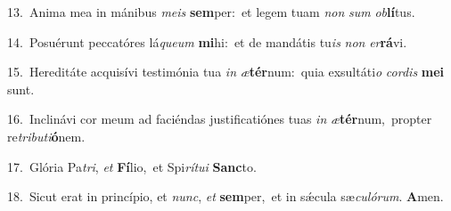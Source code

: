 {\numbfont\textcolor{\numbcolor}{13.}}~Anima mea in mánibus \textit{me}\-\textit{is} \textbf{sem}\-per:~\star et legem tuam \textit{non} \textit{sum} \textit{ob}\-\textbf{lí}tus.\par
{\numbfont\textcolor{\numbcolor}{14.}}~Posuérunt peccatóres lá\-\textit{que}\-\textit{um} \textbf{mi}\-hi:~\star et de mandátis tu\textit{is} \textit{non} \textit{er}\-\textbf{rá}vi.\par
{\numbfont\textcolor{\numbcolor}{15.}}~Hereditáte acquisívi testimónia tua \textit{in} \textit{æ}\-\textbf{tér}num:~\star quia exsultáti\textit{o} \textit{cor}\-\textit{dis} \textbf{me}\-\textbf{i} sunt.\par
{\numbfont\textcolor{\numbcolor}{16.}}~Inclinávi cor meum ad faciéndas justificatiónes tuas \textit{in} \textit{æ}\-\textbf{tér}num,~\star propter re\-\textit{tri}\-\textit{bu}\textit{ti}\textbf{ó}nem.\par
{\numbfont\textcolor{\numbcolor}{17.}}~Glória Pa\-\textit{tri}\-, \textit{et} \textbf{Fí}\-lio,~\star et Spi\-\textit{rí}\-\textit{tu}\textit{i} \textbf{Sanc}\-to.\par
{\numbfont\textcolor{\numbcolor}{18.}}~Sicut erat in princípio, et \textit{nunc}\-, \textit{et} \textbf{sem}\-per,~\star et in sǽcula sæ\-\textit{cu}\-\textit{ló}\textit{rum}. \textbf{A}\-men.\par
